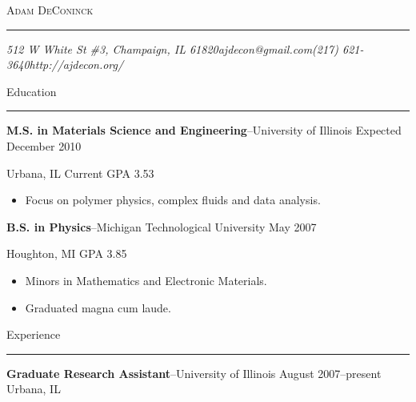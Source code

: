 \documentclass[10pt]{article}
\makeatletter
\newcommand{\name}{Adam DeConinck}
\newcommand{\addr}{512 W White St \#3, Champaign, IL 61820}
\newcommand{\phone}{(217) 621-3640}
\newcommand{\email}{ajdecon@gmail.com}
\newcommand{\website}{http://ajdecon.org/}
\newcommand{\linkedin}{http://www.linkedin.com/in/ajdecon}
\newcommand{\bigname}[1]{
	\begin{center}\fontfamily{phv}\selectfont\Huge\scshape#1\end{center}
}
\newcommand{\bigsection}[1]{	
	\vspace{4pt}
	{\fontfamily{phv}\selectfont\Large#1}

	\vspace{-10pt} \rule{\textwidth}{1pt}
}
\newcommand{\jobitem}[4]{
    \vspace{4pt}

    \textbf{#1}--#2 \hfill #3\\ #4

    \vspace{-8pt}
}
\makeatother
\begin{document}
 \selectfont

\bigname{\name}

\vspace{-8pt} \rule{\textwidth}{1pt}

\vspace{-1pt} {\small\itshape \addr \hfill \email \hfill \phone \hfill \website} %

\vspace{16pt}
\bigsection{Education}
\vspace{-10pt}

\textbf{M.S. in Materials Science and Engineering}--University of Illinois \hfill Expected December 2010

Urbana, IL \hfill Current GPA 3.53
\vspace{-6pt}
\begin{itemize}\setlength{\itemsep}{0cm}
  \setlength{\parskip}{0cm}
\item Focus on polymer physics, complex fluids and data analysis.
\end{itemize}

\textbf{B.S. in Physics}--Michigan Technological University \hfill May 2007

Houghton, MI \hfill GPA 3.85
\vspace{-6pt}
\begin{itemize}\setlength{\itemsep}{0cm}
  \setlength{\parskip}{0cm}
\item Minors in Mathematics and Electronic Materials.
\item Graduated magna cum laude.
\end{itemize}


\vspace{4pt}
\bigsection{Experience}

\vspace{-10pt}

\jobitem{Graduate Research Assistant}{University of Illinois}{August 2007--present}{Urbana, IL}
\end{document}
